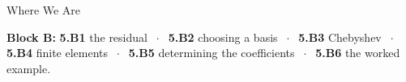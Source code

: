 

\graphicspath{{./figures/}}





\makedecktitle

\begin{frame}{Where We Are}
\vspace{-1mm}
\begin{center}
\small \textbf{Block B:} \textbf{5.B1} the residual $\;\cdot\;$ \textbf{5.B2} choosing a basis $\;\cdot\;$ \textbf{5.B3} Chebyshev $\;\cdot\;$ \textbf{5.B4} finite elements $\;\cdot\;$ \textbf{5.B5} determining the coefficients $\;\cdot\;$ \textbf{5.B6} the worked example.
\end{center}
\end{frame}

